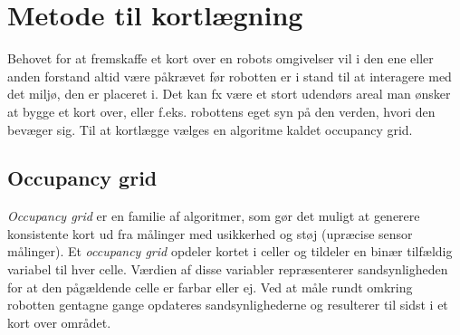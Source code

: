 \section{Metode til kortlægning}
Behovet for at fremskaffe et kort over en robots omgivelser vil i den ene eller anden forstand altid være påkrævet før robotten er i stand til at interagere med det miljø, den er placeret i.
Det kan fx være et stort udendørs areal man ønsker at bygge et kort over, eller f.eks. robottens eget syn på den verden, hvori den bevæger sig.
Til at kortlægge vælges en algoritme kaldet occupancy grid. 

\subsection{Occupancy grid}
\textit{Occupancy grid} er en familie af algoritmer, som gør det muligt at generere konsistente kort ud fra målinger med usikkerhed og støj (upræcise sensor målinger).
Et \textit{occupancy grid} opdeler kortet i celler og tildeler en binær tilfældig variabel til hver celle.
Værdien af disse variabler repræsenterer sandsynligheden for at den pågældende celle er farbar eller ej.
Ved at måle rundt omkring robotten gentagne gange opdateres sandsynlighederne og resulterer til sidst i et kort over området.